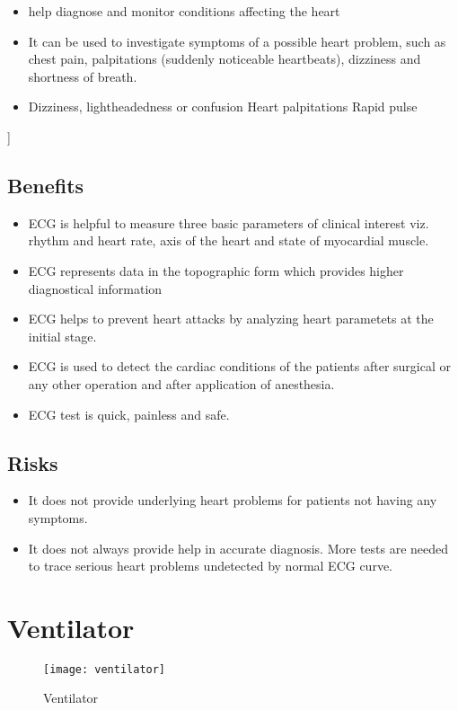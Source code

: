 \documentclass[12pt]{article}
\begin{document}
\begin{itemize}
\item help diagnose and monitor conditions affecting the heart
\item It can be used to investigate symptoms of a possible heart problem, such as chest pain, palpitations (suddenly noticeable heartbeats), dizziness and shortness of breath.
\item Dizziness, lightheadedness or confusion
Heart palpitations
Rapid pulse
\end{itemize}]
 
 \subsection{Benefits}
 
\begin{itemize}
\item ECG is helpful to measure three basic parameters of clinical interest viz. rhythm and heart rate, axis of the heart and state of myocardial muscle.
\item ECG represents data in the topographic form which provides higher diagnostical information
\item ECG helps to prevent heart attacks by analyzing heart parametets at the initial stage.
\item ECG is used to detect the cardiac conditions of the patients after surgical or any other operation and after application of anesthesia.
\item ECG test is quick, painless and safe.

\end{itemize}
 \subsection{Risks}
 \begin{itemize}
 \item It does not provide underlying heart problems for patients not having any symptoms.
 \item It does not always provide help in accurate diagnosis. More tests are needed to trace serious heart problems undetected by normal ECG curve.
 
 \end{itemize}
 
\section{Ventilator}
\begin{figure}
\centering
\texttt{[image: ventilator]}
\caption{Ventilator}
\end{figure}
\end{document}
